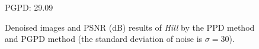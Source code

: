 \begin{figure}[t!]
{\begin{minipage}[t]{0.24\textwidth}
{\footnotesize PGPD: 29.09}
\end{minipage}
}\vspace{-3mm}
    \caption{Denoised images and PSNR (dB) results of \textsl{Hill} by the PPD method and PGPD method (the standard deviation of noise is $\sigma=30$).}
    \label{fig2-6}
\end{figure}


\begin{figure}[ht!]
    \centering
{}
\end{figure}
